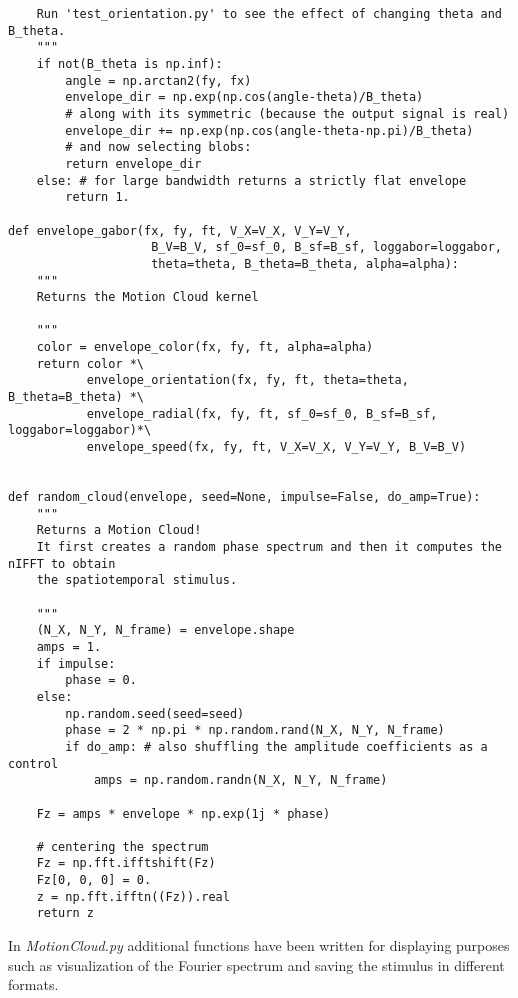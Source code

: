 \documentclass[a4paper,11pt]{article}%
\begin{document}
\begin{lstlisting}
    Run 'test_orientation.py' to see the effect of changing theta and B_theta.
    """
    if not(B_theta is np.inf):
        angle = np.arctan2(fy, fx)
        envelope_dir = np.exp(np.cos(angle-theta)/B_theta)
        # along with its symmetric (because the output signal is real)
        envelope_dir += np.exp(np.cos(angle-theta-np.pi)/B_theta)
        # and now selecting blobs:
        return envelope_dir
    else: # for large bandwidth returns a strictly flat envelope
        return 1.

def envelope_gabor(fx, fy, ft, V_X=V_X, V_Y=V_Y,
                    B_V=B_V, sf_0=sf_0, B_sf=B_sf, loggabor=loggabor,
                    theta=theta, B_theta=B_theta, alpha=alpha):
    """
    Returns the Motion Cloud kernel

    """
    color = envelope_color(fx, fy, ft, alpha=alpha)
    return color *\
           envelope_orientation(fx, fy, ft, theta=theta, B_theta=B_theta) *\
           envelope_radial(fx, fy, ft, sf_0=sf_0, B_sf=B_sf, loggabor=loggabor)*\
           envelope_speed(fx, fy, ft, V_X=V_X, V_Y=V_Y, B_V=B_V)


def random_cloud(envelope, seed=None, impulse=False, do_amp=True):
    """
    Returns a Motion Cloud!
    It first creates a random phase spectrum and then it computes the nIFFT to obtain
    the spatiotemporal stimulus.

    """
    (N_X, N_Y, N_frame) = envelope.shape
    amps = 1.
    if impulse:
        phase = 0.
    else:
        np.random.seed(seed=seed)
        phase = 2 * np.pi * np.random.rand(N_X, N_Y, N_frame)
        if do_amp: # also shuffling the amplitude coefficients as a control
            amps = np.random.randn(N_X, N_Y, N_frame)

    Fz = amps * envelope * np.exp(1j * phase)
    
    # centering the spectrum
    Fz = np.fft.ifftshift(Fz)
    Fz[0, 0, 0] = 0.
    z = np.fft.ifftn((Fz)).real  
    return z
\end{lstlisting}

In \textit{MotionCloud.py} additional functions have been written for displaying purposes such as visualization of the Fourier spectrum and saving the stimulus in different formats.
\end{document}
